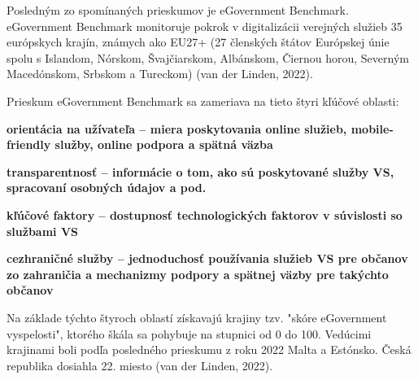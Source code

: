 Posledným zo spomínaných prieskumov je eGovernment Benchmark. eGovernment Benchmark monitoruje pokrok v digitalizácii verejných služieb 35 európskych krajín, známych ako EU27+ (27 členských štátov Európskej únie spolu s Islandom, Nórskom, Švajčiarskom, Albánskom, Čiernou horou, Severným Macedónskom, Srbskom a Tureckom) \scr(van der Linden, 2022).

Prieskum eGovernment Benchmark sa zameriava na tieto štyri kľúčové oblasti:

\startitemize
\item{\start\bf orientácia na užívateľa \stop -- miera poskytovania online služieb, mobile-friendly služby, online podpora a spätná väzba}
\item{\start\bf transparentnosť  \stop -- informácie o tom, ako sú poskytované služby VS, spracovaní osobných údajov a pod.}
\item{\start\bf kľúčové faktory \stop -- dostupnosť technologických faktorov v súvislosti so službami VS}
\item{\start\bf cezhraničné služby \stop -- jednoduchosť používania služieb VS pre občanov zo zahraničia a mechanizmy podpory a spätnej väzby pre takýchto občanov}
\stopitemize 

Na základe týchto štyroch oblastí získavajú krajiny tzv. "skóre eGovernment vyspelosti", ktorého škála sa pohybuje na stupnici od 0 do 100. Vedúcimi krajinami boli podľa posledného prieskumu z roku 2022 Malta a Estónsko. Česká republika dosiahla 22. miesto \scr(van der Linden, 2022). 


\setupTABLE[frame=on]
\setupTABLE[row][first][background=color, backgroundcolor=lightgray, style=bold]
\setupTABLE[column][1][width=12cc]
\setupTABLE[column][2][width=6cc]
\setupTABLE[column][3][width=14cc]
\setupTABLE[r][each][align={middle,lohi}]


